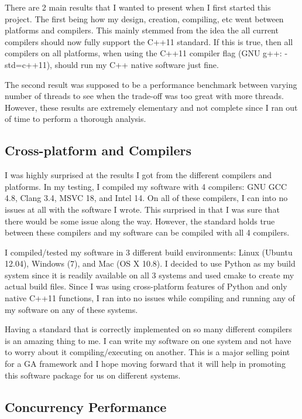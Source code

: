 \documentclass{acm_proc_article-sp}
\begin{document}
There are 2 main results that I wanted to present when I first started this project. The first being how my design, creation, compiling, etc went between platforms and compilers. This mainly stemmed from the idea the all current compilers should now fully support the C++11 standard. If this is true, then all compilers on all platforms, when using the C++11 compiler flag (GNU g++: -std=c++11), should run my C++ native software just fine.

The second result was supposed to be a performance benchmark between varying number of threads to see when the trade-off was too great with more threads. However, these results are extremely elementary and not complete since I ran out of time to perform a thorough analysis.


\subsection{Cross-platform and Compilers}

I was highly surprised at the results I got from the different compilers and platforms. In my testing, I compiled my software with 4 compilers: GNU GCC 4.8, Clang 3.4, MSVC 18, and Intel 14. On all of these compilers, I can into no issues at all with the software I wrote. This surprised in that I was sure that there would be some issue along the way. However, the standard holds true between these compilers and my software can be compiled with all 4 compilers. 

I compiled/tested my software in 3 different build environments: Linux (Ubuntu 12.04), Windows (7), and Mac (OS X 10.8). I decided to use Python as my build system since it is readily available on all 3 systems and used cmake to create my actual build files. Since I was using cross-platform features of Python and only native C++11 functions, I ran into no issues while compiling and running any of my software on any of these systems.

Having a standard that is correctly implemented on so many different compilers is an amazing thing to me. I can write my software on one system and not have to worry about it compiling/executing on another. This is a major selling point for a GA framework and I hope moving forward that it will help in promoting this software package for us on different systems.


\subsection{Concurrency Performance}
\end{document}
